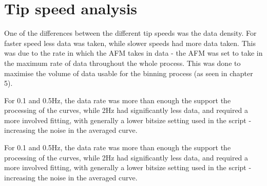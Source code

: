 \section{Tip speed analysis}

One of the differences between the different tip speeds was the data density. For faster speed less data was taken, while slower speeds had more data taken. This was due to the rate in which the AFM takes in data - the AFM was set to take in the maximum rate of data throughout the whole process. This was done to maximise the volume of data usable for the binning process (as seen in chapter 5). 

For 0.1 and 0.5Hz, the data rate was more than enough the support the processing of the curves, while 2Hz had significantly less data, and required a more involved fitting, with generally a lower bitsize setting used in the script - increasing the noise in the averaged curve.

For 0.1 and 0.5Hz, the data rate was more than enough the support the processing of the curves, while 2Hz had significantly less data, and required a more involved fitting, with generally a lower bitsize setting used in the script - increasing the noise in the averaged curve.

